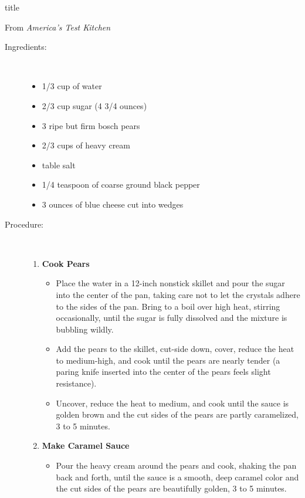 \documentclass [11pt, letterpaper] {article}
\begin{document}
 {title}

\begin{flushright}
From {\it America's Test Kitchen}
\end{flushright}

\begin{description}

\item[Ingredients:]\ \\
	\begin{itemize}
	\item 1/3 cup of water
	\item 2/3 cup sugar  (4 3/4 ounces) 
	\item 3 ripe but firm bosch pears
	\item 2/3 cups of heavy cream
	\item table salt
	\item 1/4 teaspoon of coarse ground black pepper
	\item 3 ounces of blue cheese cut into wedges
	\end{itemize}

\item[Procedure:]\ \\

	\begin{enumerate}
	\item {\bf Cook Pears}
	\begin{itemize}
	\item Place the water in a 12-inch nonstick skillet and pour the sugar into the center of the pan, taking care not to let the crystals adhere to the sides of the pan. Bring to a boil over high heat, stirring occasionally, until the sugar is fully dissolved and the mixture is bubbling wildly. 
	\item Add the pears to the skillet, cut-side down, cover, reduce the heat to medium-high, and cook until the pears are nearly tender (a paring knife inserted into the center of the pears feels slight resistance).
	\item Uncover, reduce the heat to medium, and cook until the sauce is golden brown and the cut sides of the pears are partly caramelized, 3 to 5 minutes. 
	\end{itemize}

	\item {\bf Make Caramel Sauce}
	\begin{itemize}
	\item Pour the heavy cream around the pears and cook, shaking the pan back and forth, until the sauce is a smooth, deep caramel color and the cut sides of the pears are beautifully golden, 3 to 5 minutes.
	\end{itemize}


\end{enumerate}
\end{description}
\end{document}

